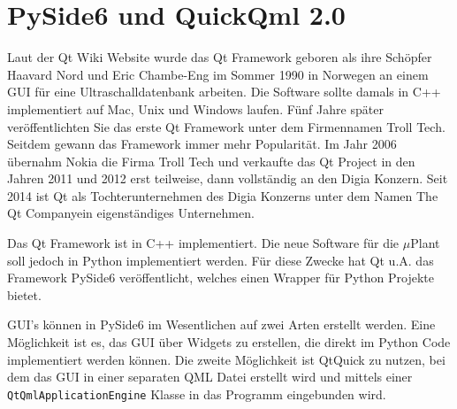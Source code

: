 \newpage
\section{PySide6 und QuickQml 2.0}

Laut der Qt Wiki Website \cite{QtWikiHistory} wurde das Qt Framework geboren als ihre Schöpfer Haavard Nord und
Eric Chambe-Eng im Sommer 1990 in Norwegen an einem GUI für eine Ultraschalldatenbank arbeiten.
Die Software sollte damals in C++ implementiert auf Mac, Unix und Windows laufen.
Fünf Jahre später veröffentlichten Sie das erste Qt Framework unter dem Firmennamen Troll Tech.
Seitdem gewann das Framework immer mehr Popularität.
Im Jahr 2006 übernahm Nokia die Firma Troll Tech und verkaufte das Qt Project in den Jahren 2011 und 2012 erst teilweise,
dann vollständig an den Digia Konzern.
Seit 2014 ist Qt als Tochterunternehmen des Digia Konzerns unter dem Namen \glqq The Qt Company\grqq ein eigenständiges Unternehmen.

Das Qt Framework ist in C++ implementiert.
Die neue Software für die $\mu$Plant soll jedoch in Python implementiert werden.
Für diese Zwecke hat Qt u.A. das Framework PySide6 veröffentlicht, welches einen Wrapper für Python Projekte bietet.

GUI's können in PySide6 im Wesentlichen auf zwei Arten erstellt werden.
Eine Möglichkeit ist es, das GUI über Widgets\cite{pysideQtWidgets} zu erstellen, die direkt im Python Code implementiert werden können.
Die zweite Möglichkeit ist QtQuick \cite{pysideQtQuick} zu nutzen, bei dem das GUI in einer separaten QML Datei erstellt wird und
mittels einer \verb|QtQmlApplicationEngine| Klasse in das Programm eingebunden wird.

